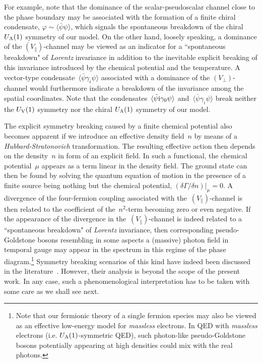 \documentclass[prd,english,preprintnumbers,amsmath,amssymb,nofootinbib,twocolumn,superscriptaddress]{revtex4-1}
\begin{document}
{{For example,
note that the dominance of the scalar-pseudoscalar channel close to the phase boundary may be associated
with the formation of a finite chiral condensate, $\varphi \sim \langle \bar{\psi}\psi \rangle$,
which signals the spontaneous breakdown of the chiral $U_{\rm A}(1)$ symmetry of our model. On the other hand, loosely speaking,
a dominance of the $(V_{\parallel})$-channel may be viewed as an indicator for a ``spontaneous breakdown" of {\it Lorentz} invariance in
addition to the inevitable explicit breaking of this invariance introduced by the chemical potential and the temperature.
{A vector-type condensate~$\langle \bar{\psi}\gamma_i\psi\rangle$ associated with a dominance of
the $(V_{\perp})$-channel would furthermore indicate a breakdown of the invariance among the spatial coordinates.
Note that the condensates~$\langle \bar{\psi}{\rm i}\gamma_0\psi\rangle$ and~$\langle \bar{\psi}\gamma_i\psi\rangle$
break neither} the $U_{\rm V}(1)$ symmetry nor the chiral $U_{\rm A}(1)$ symmetry of our model.

The explicit symmetry breaking caused by a finite chemical potential also becomes apparent if we  
introduce an effective density field~$n$ by means of a {\it Hubbard-Stratonovich} transformation. The resulting effective
action then depends on the density~$n$ in form of an explicit field. 
In such a functional, the chemical potential~$\mu$ appears as a term
linear in the density field. The ground state can then be found by solving the quantum equation of motion
in the presence of a finite source being nothing but the {chemical potential, $(\delta \Gamma/\delta n)|_{\mu} = 0$.}
A divergence of the
four-fermion coupling associated with the~$(V_{\parallel})$-channel 
is then related to the coefficient of the~$n^2$-term becoming zero or even negative.
If the appearance of the divergence in the~$(V_{\parallel})$-channel is indeed related to 
a ``spontaneous breakdown" of {\it Lorentz} invariance, then
corresponding pseudo-Goldstone bosons resembling in some aspects a (massive) photon field in temporal gauge
may appear in the spectrum in this regime of the phase diagram.\footnote{Note that our fermionic theory of a single fermion species
may also be viewed as an effective low-energy model for {\it massless} electrons. In QED with {\it massless} electrons (i.e. $U_{\rm A}(1)$-symmetric QED), 
such photon-like pseudo-Goldstone bosons potentially appearing at high densities could mix with the real photons.}    
Symmetry breaking scenarios of this kind have indeed
been discussed in the literature~\cite{Bjorken:1963vg,BialynickiBirula:1963zz,Guralnik:1964zz,Banks:1980rh,oai:arXiv.org:hep-th/0203221}. 
However, their analysis is beyond the scope of the present work. In any case, such a phenomenological interpretation
has to be taken {with some care as we shall see next.}

}}
\end{document}

